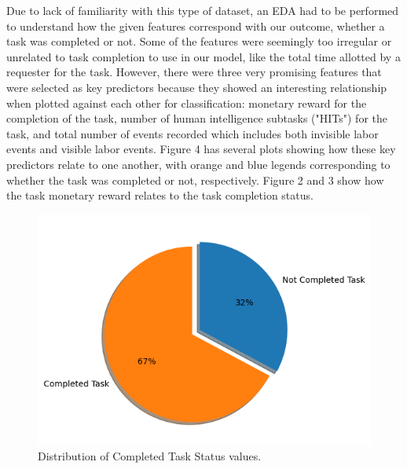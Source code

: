 \documentclass[11pt]{article}
\begin{document}
Due to lack of familiarity with this type of dataset, an EDA had to be performed to understand how the given features correspond with our outcome, whether a task was completed or not. Some of the features were seemingly too irregular or unrelated to task completion to use in our model, like the total time allotted by a requester for the task. However, there were three very promising features that were selected as key predictors because they showed an interesting relationship when plotted against each other for classification: monetary reward for the completion of the task, number of human intelligence subtasks ("HITs") for the task, and total number of events recorded which includes both invisible labor events and visible labor events. Figure 4 has several plots showing how these key predictors relate to one another, with orange and blue legends corresponding to whether the task was completed or not, respectively. Figure 2 and 3 show how the task monetary reward relates to the task completion status.

\begin{figure}[hbt!]
  \centering
  \includegraphics[width=425pt]{figures/distribution-completed-tasks-pie-chart}
  \caption{Distribution of Completed Task Status values.}
\end{figure}

\clearpage
\end{document}
